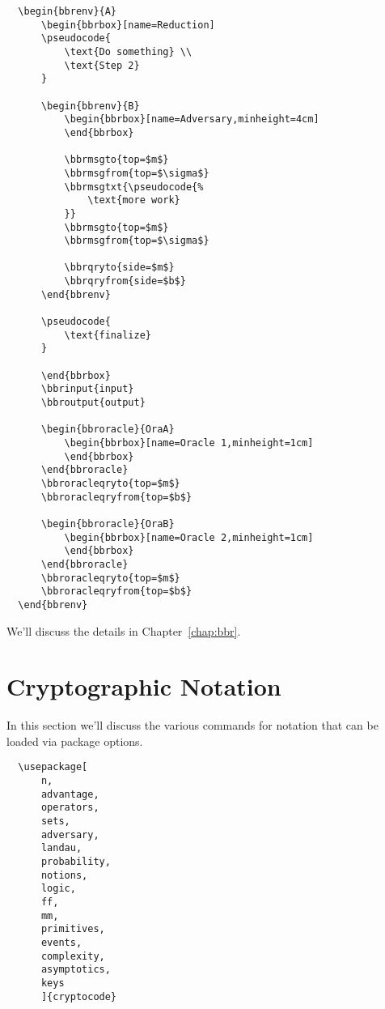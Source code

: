\documentclass[a4paper]{report}
\begin{document}
  \begin{lstlisting}
  \begin{bbrenv}{A}
	  \begin{bbrbox}[name=Reduction]
	  \pseudocode{
		  \text{Do something} \\
		  \text{Step 2} 
	  }
  
	  \begin{bbrenv}{B}
		  \begin{bbrbox}[name=Adversary,minheight=4cm]
		  \end{bbrbox}
  
		  \bbrmsgto{top=$m$}
		  \bbrmsgfrom{top=$\sigma$}
		  \bbrmsgtxt{\pseudocode{%
			  \text{more work} 
		  }}
		  \bbrmsgto{top=$m$}
		  \bbrmsgfrom{top=$\sigma$}
  
		  \bbrqryto{side=$m$}
		  \bbrqryfrom{side=$b$}
	  \end{bbrenv}
  
	  \pseudocode{
		  \text{finalize} 
	  }	
  
	  \end{bbrbox}
	  \bbrinput{input}
	  \bbroutput{output}
  
	  \begin{bbroracle}{OraA}
		  \begin{bbrbox}[name=Oracle 1,minheight=1cm]
		  \end{bbrbox}
	  \end{bbroracle}
	  \bbroracleqryto{top=$m$}
	  \bbroracleqryfrom{top=$b$}
  
	  \begin{bbroracle}{OraB}
		  \begin{bbrbox}[name=Oracle 2,minheight=1cm]
		  \end{bbrbox}
	  \end{bbroracle}
	  \bbroracleqryto{top=$m$}
	  \bbroracleqryfrom{top=$b$}
  \end{bbrenv}
  \end{lstlisting}
  We'll discuss the details in Chapter~\ref{chap:bbr}.
  
  \chapter{Cryptographic Notation}
  \label{chap:commands}
  In this section we'll discuss the various commands for notation that can be loaded via package options.
  \begin{lstlisting}
  \usepackage[
	  n,
	  advantage,
	  operators,
	  sets,
	  adversary,
	  landau,
	  probability,
	  notions,
	  logic,
	  ff,
	  mm,
	  primitives,
	  events,
	  complexity,
	  asymptotics,
	  keys
	  ]{cryptocode}
  \end{lstlisting}
  
\end{document}
